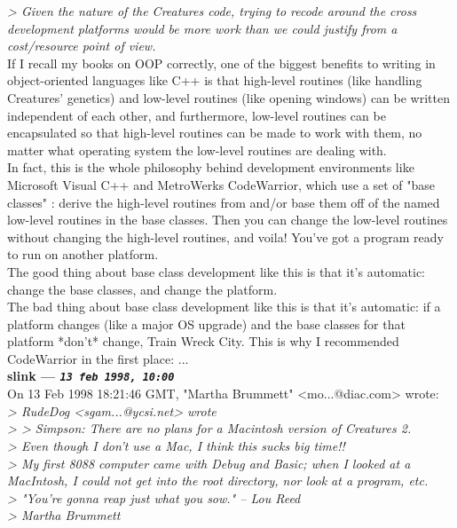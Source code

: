 \documentclass[11pt,twoside,a4paper]{article}
\begin{document}
\begin{multicols*}{2}
\emph{> Given the nature of the Creatures code, trying to recode around the cross development platforms would be more work than we could justify from a cost/resource point of view.}~\\

If I recall my books on OOP correctly, one of the biggest benefits to writing in object-oriented languages like C++ is that high-level routines (like handling Creatures' genetics) and low-level routines (like opening windows) can be written independent of each other, and furthermore, low-level routines can be encapsulated so that high-level routines can be made to work with them, no matter what operating system the low-level routines are dealing with.~\\

In fact, this is the whole philosophy behind development environments like Microsoft Visual C++ and MetroWerks CodeWarrior, which use a set of "base classes" : derive the high-level routines from and/or base them off of the named low-level routines in the base classes. Then you can change the low-level routines without changing the high-level routines, and voila! You've got a program ready to run on another platform.~\\

The good thing about base class development like this is that it's automatic: change the base classes, and change the platform.~\\

The bad thing about base class development like this is that it's automatic: if a platform changes (like a major OS upgrade) and the base classes for that platform *don't* change, Train Wreck City. This is why I recommended CodeWarrior in the first place: ...~\\

	
		
\textbf{slink --- \emph{\texttt{13 feb 1998, 10:00}}}~\\

On 13 Feb 1998 18:21:46 GMT, "Martha Brummett" <mo...@diac.com> wrote:~\\

\emph{> RudeDog <sgam...@ycsi.net> wrote}~\\
\emph{> > Simpson: There are no plans for a Macintosh version of Creatures 2.}~\\
\emph{> Even though I don't use a Mac, I think this sucks big time!!}~\\

\emph{> My first 8088 computer came with Debug and Basic; when I looked at a MacIntosh, I could not get into the root directory, nor look at a program, etc.}~\\
\emph{> "You're gonna reap just what you sow." -- Lou Reed}~\\
\emph{> Martha Brummett}~\\


\end{multicols*}
\end{document}
